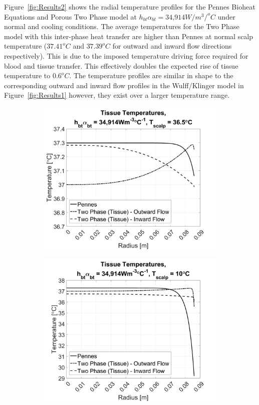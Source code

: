 \documentclass[11pt,english,a4paper,twoside,openright]{report}
\begin{document}
{{{{{{{{Figure~\ref{fig:Results2} shows the radial temperature profiles for the Pennes Bioheat Equations and Porous Two Phase model at $h_{bt}\alpha_{bt} = \text{34,914}W/m^{3}/^{o}C$ under normal and cooling conditions. The average temperatures for the Two Phase model with this inter-phase heat transfer are higher than Pennes at normal scalp temperature ($37.41^{o}C$ and $37.39^{o}C$ for outward and inward flow directions respectively). This is due to the imposed temperature driving force required for blood and tissue transfer. This effectively doubles the expected rise of tissue temperature to $0.6^{o}C$. The temperature profiles are similar in shape to the corresponding outward and inward flow profiles in the Wulff/Klinger model in Figure~\ref{fig:Results1} however, they exist over a larger temperature range.

\begin{figure}[h]
	\centering
	\begin{subfigure}[b]{0.49\textwidth}
		\includegraphics[width=\textwidth]{1DHemisphere/figure5}
	\end{subfigure}
	\begin{subfigure}[b]{0.49\textwidth}
		\includegraphics[width=\textwidth]{1DHemisphere/figure6}

\end{subfigure}
\end{figure}}}}}}}}}
\end{document}
